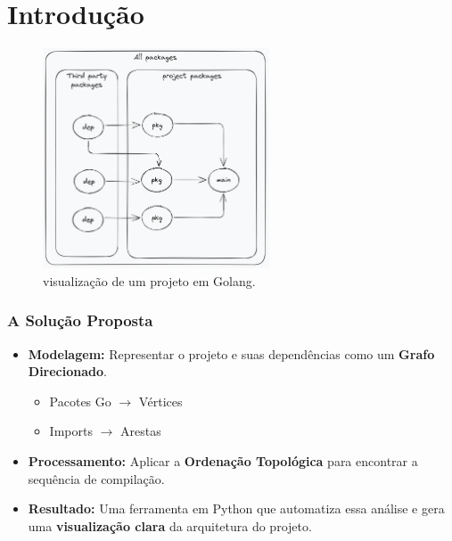 \documentclass{beamer}
\begin{document}
\section{Introdução}
\begin{frame}
    \begin{figure}
        \includegraphics[width=0.6\textwidth]{images/package_overview.png}
        \caption{visualização de um projeto em Golang.}
        \label{fig:grafo-ciclico}
    \end{figure}
\end{frame}


\begin{frame}
    \frametitle{A Solução Proposta}
    
    \begin{itemize}
        \item \textbf{Modelagem:} Representar o projeto e suas dependências como um \textbf{Grafo Direcionado}.
        \begin{itemize}
            \item Pacotes Go $\rightarrow$ Vértices
            \item Imports $\rightarrow$ Arestas
        \end{itemize}
        \bigskip
        \item \textbf{Processamento:} Aplicar a \textbf{Ordenação Topológica} para encontrar a sequência de compilação.
        \bigskip
        \item \textbf{Resultado:} Uma ferramenta em Python que automatiza essa análise e gera uma \textbf{visualização clara} da arquitetura do projeto.
    \end{itemize}
\end{frame}
\end{document}
